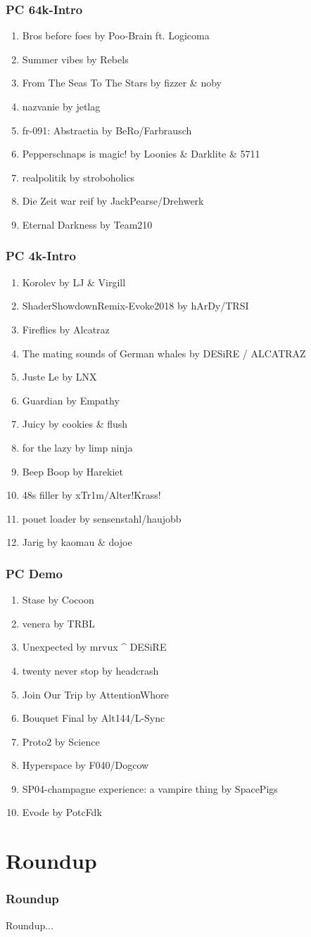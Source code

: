 \documentclass{beamer}
\begin{document}
\begin{frame}
  \frametitle{PC 64k-Intro}
  \begin{enumerate}
  \item Bros before foes by Poo-Brain ft. Logicoma
  \item Summer vibes by Rebels
  \item From The Seas To The Stars by fizzer \& noby
  \item nazvanie by jetlag
  \item fr-091: Abstractia by BeRo/Farbrausch
  \item Pepperschnaps is magic! by Loonies \& Darklite \& 5711
  \item realpolitik by stroboholics
  \item Die Zeit war reif by JackPearse/Drehwerk
  \item Eternal Darkness by Team210
  \end{enumerate}
\end{frame}

\begin{frame}
  \frametitle{PC 4k-Intro}
  \begin{enumerate}
  \item Korolev by LJ \& Virgill
  \item ShaderShowdownRemix-Evoke2018 by hArDy/TRSI
  \item Fireflies by Alcatraz
  \item The mating sounds of German whales by DESiRE / ALCATRAZ
  \item Juste Le by LNX
  \item Guardian by Empathy
  \item Juicy by cookies \& flush
  \item for the lazy by limp ninja
  \item Beep Boop by Harekiet
  \item 48s filler by xTr1m/Alter!Krass!
  \item pouet loader by sensenstahl/haujobb
  \item Jarig by kaomau \& dojoe
  \end{enumerate}
\end{frame}

\begin{frame}
  \frametitle{PC Demo}
  \begin{enumerate}
  \item Stase by Cocoon
  \item venera by TRBL
  \item Unexpected by mrvux \^{} DESiRE
  \item twenty never stop by headcrash
  \item Join Our Trip by AttentionWhore
  \item Bouquet Final by Alt144/L-Sync
  \item Proto2 by Science
  \item Hyperspace by F040/Dogcow
  \item SP04-champagne experience: a vampire thing by SpacePigs
  \item Evode by PotcFdk
  \end{enumerate}
\end{frame}



\section{Roundup}
\begin{frame}
  \frametitle{Roundup}
  Roundup...
\end{frame}
\end{document}
